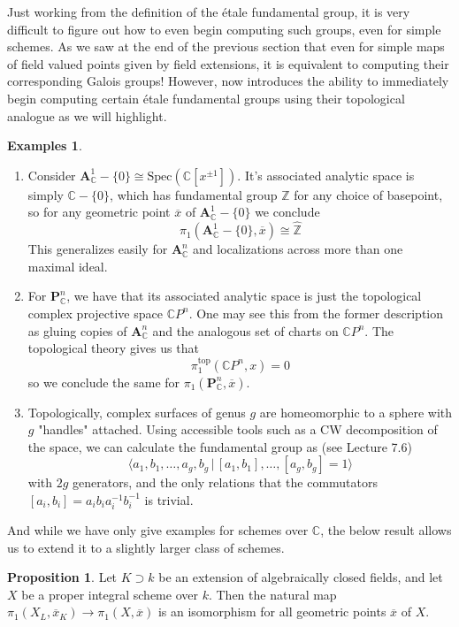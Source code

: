 \documentclass{article}
\theoremstyle{definition}
\newtheorem{proposition}[theorem]{Proposition}
\newtheorem{examples}[theorem]{Examples}
\theoremstyle{remark}
\newcommand{\C}{\mathbb{C}}
\newcommand{\Z}{\mathbb{Z}}
\begin{document}
Just working from the definition of the \'etale fundamental group, it is very difficult to figure out how to even begin computing such groups, even for simple schemes. 
As we saw at the end of the previous section that even for simple maps of field valued points given by field extensions, it is equivalent to computing their corresponding Galois groups!
However,  now introduces the ability to immediately begin computing certain \'etale fundamental groups using their topological analogue as we will highlight.

\begin{examples} \text{}
	\begin{enumerate} 	\item Consider $\textbf{A}_{\C}^1 - \{0\} \cong \text{Spec}(\C[x^{\pm 1}])$. 
		It's associated analytic space is simply $\C - \{0\}$, which has fundamental group $\Z$ for any choice of basepoint, so for any geometric point $\overline{x}$ of $\textbf{A}_{\C}^1 - \{0\}$ we conclude
		\[\pi_1(\textbf{A}_{\C}^1 - \{0\}, \overline{x}) \cong \widehat{\Z}\]
		This generalizes easily for $\textbf{A}_{\C}^n$  and localizations across more than one maximal ideal. 
		\item For $\textbf{P}_{\C}^n$, we have that its associated analytic space is just the topological complex projective space $\C P^n$.
	One may see this from the former description as gluing copies of $\textbf{A}_{\C}^n$ and the analogous set of charts on $\C P^n$.
	The topological theory gives us that 
	\[\pi_1^{\text{top}}(\C P^n, x) = 0\]
	so we conclude the same for $\pi_1(\textbf{P}_{\C}^n, \overline{x})$.
\item Topologically, complex surfaces of genus $g$ are homeomorphic to a sphere with $g$ "handles" attached.
	Using accessible tools such as a CW decomposition of the space, we can calculate the fundamental group as (see \cite{FomenkoFuchs} Lecture 7.6)
	\[\langle a_1, b_1, \dots, a_g, b_g \,|\, [a_1,b_1], \dots, [a_g,b_g] = 1\rangle \]
	with $2g$ generators, and the only relations that the commutators $[a_i, b_i] = a_i b_i a_i^{-1} b_i^{-1}$ is trivial.
\end{enumerate}
\end{examples}

And while we have only give examples for schemes over $\C$, the below result allows us to extend it to a slightly larger class of schemes. 
\begin{proposition}
	Let $K \supset k$ be an extension of algebraically closed fields, and let $X$ be a proper integral scheme over $k$.
	Then the natural map $\pi_1(X_L, \overline{x}_K) \to \pi_1(X, \overline{x})$ is an isomorphism for all geometric points $\overline{x}$ of $X$.
\end{proposition} 
\end{document}

